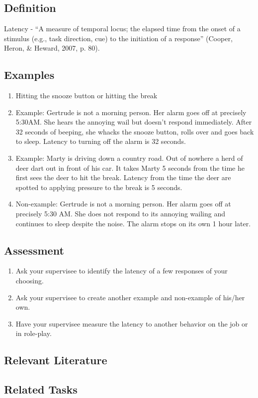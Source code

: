 \clearpage \section{\fouraFour{}}
\subsection{Definition}  
Latency - ``A measure of temporal locus; the elapsed time from the onset of a stimulus (e.g., task direction, cue) to the initiation of a response'' (Cooper, Heron, \& Heward, 2007, p. 80).  

\subsection{Examples}
\begin{enumerate}
\item Hitting the snooze button or hitting the break
\item Example: Gertrude is not a morning person.  Her alarm goes off at precisely 5:30AM.  She hears the annoying wail but doesn't respond immediately.  After 32 seconds of beeping, she whacks the snooze button, rolls over and goes back to sleep.  Latency to turning off the alarm is 32 seconds.
\item Example:  Marty is driving down a country road.  Out of nowhere a herd of deer dart out in front of his car.  It takes Marty 5 seconds from the time he first sees the deer to hit the break.  Latency from the time the deer are spotted to applying pressure to the break is 5 seconds.    
\item Non-example: Gertrude is not a morning person.  Her alarm goes off at precisely 5:30 AM.  She does not respond to its annoying wailing and continues to sleep despite the noise.  The alarm stops on its own 1 hour later.
\end{enumerate}
%
\subsection{Assessment}
\begin{enumerate}
\item Ask your supervisee to identify the latency of a few responses of your choosing.  
\item Ask your supervisee to create another example and non-example of his/her own.
\item Have your supervisee measure the latency to another behavior on the job or in role-play.
\end{enumerate}
%
\subsection{Relevant Literature}
\begin{refsection}
\nocite{cooper2007applied,thomason2011response}
\printbibliography[heading=none]
\end{refsection}

\subsection{Related Tasks}
\fourhOne{}\\
\fouriOne{}\\
\fourFKFourtySeven{}\\
